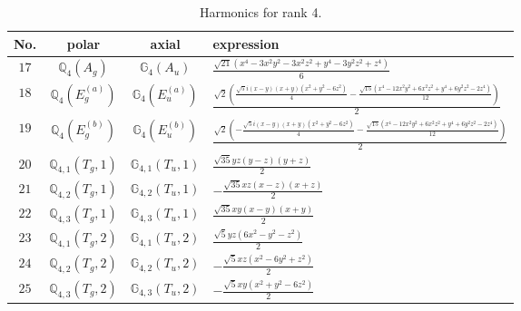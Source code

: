 \documentclass[fleqn,8pt,landscape]{jsarticle}
\begin{document}
\begin{table}[ht!]
\begin{center}
\caption{Harmonics for rank 4.}
\renewcommand{\arraystretch}{1.3}
\begin{tabular}{cccl} \hline \hline
No. & polar & axial & expression \\ \hline
$ 17 $ & $ \mathbb{Q}_{4}(A_{g}) $ & $ \mathbb{G}_{4}(A_{u}) $ & $ \frac{\sqrt{21} \left(x^{4} - 3 x^{2} y^{2} - 3 x^{2} z^{2} + y^{4} - 3 y^{2} z^{2} + z^{4}\right)}{6} $ \\
$ 18 $ & $ \mathbb{Q}_{4}(E_{g}^{(a)}) $ & $ \mathbb{G}_{4}(E_{u}^{(a)}) $ & $ \frac{\sqrt{2} \left(\frac{\sqrt{5} i \left(x - y\right) \left(x + y\right) \left(x^{2} + y^{2} - 6 z^{2}\right)}{4} - \frac{\sqrt{15} \left(x^{4} - 12 x^{2} y^{2} + 6 x^{2} z^{2} + y^{4} + 6 y^{2} z^{2} - 2 z^{4}\right)}{12}\right)}{2} $ \\
$ 19 $ & $ \mathbb{Q}_{4}(E_{g}^{(b)}) $ & $ \mathbb{G}_{4}(E_{u}^{(b)}) $ & $ \frac{\sqrt{2} \left(- \frac{\sqrt{5} i \left(x - y\right) \left(x + y\right) \left(x^{2} + y^{2} - 6 z^{2}\right)}{4} - \frac{\sqrt{15} \left(x^{4} - 12 x^{2} y^{2} + 6 x^{2} z^{2} + y^{4} + 6 y^{2} z^{2} - 2 z^{4}\right)}{12}\right)}{2} $ \\
$ 20 $ & $ \mathbb{Q}_{4,1}(T_{g},1) $ & $ \mathbb{G}_{4,1}(T_{u},1) $ & $ \frac{\sqrt{35} y z \left(y - z\right) \left(y + z\right)}{2} $ \\
$ 21 $ & $ \mathbb{Q}_{4,2}(T_{g},1) $ & $ \mathbb{G}_{4,2}(T_{u},1) $ & $ - \frac{\sqrt{35} x z \left(x - z\right) \left(x + z\right)}{2} $ \\
$ 22 $ & $ \mathbb{Q}_{4,3}(T_{g},1) $ & $ \mathbb{G}_{4,3}(T_{u},1) $ & $ \frac{\sqrt{35} x y \left(x - y\right) \left(x + y\right)}{2} $ \\
$ 23 $ & $ \mathbb{Q}_{4,1}(T_{g},2) $ & $ \mathbb{G}_{4,1}(T_{u},2) $ & $ \frac{\sqrt{5} y z \left(6 x^{2} - y^{2} - z^{2}\right)}{2} $ \\
$ 24 $ & $ \mathbb{Q}_{4,2}(T_{g},2) $ & $ \mathbb{G}_{4,2}(T_{u},2) $ & $ - \frac{\sqrt{5} x z \left(x^{2} - 6 y^{2} + z^{2}\right)}{2} $ \\
$ 25 $ & $ \mathbb{Q}_{4,3}(T_{g},2) $ & $ \mathbb{G}_{4,3}(T_{u},2) $ & $ - \frac{\sqrt{5} x y \left(x^{2} + y^{2} - 6 z^{2}\right)}{2} $ \\
 \hline \hline
\end{tabular}
\end{center}
\end{table}
\end{document}
